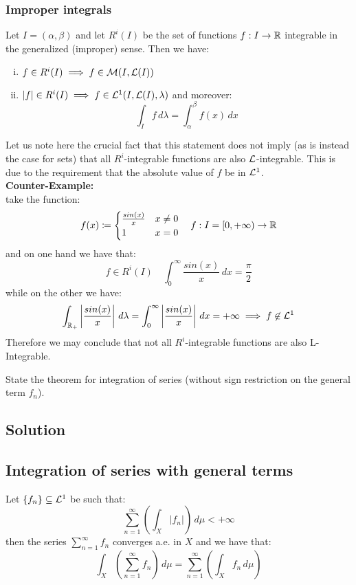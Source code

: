 \subsubsection*{Improper integrals}
Let $I=(\alpha,\beta)$ and let $R^i(I)$ be the set of functions $f:I\to\mathbb{R}$ integrable in the generalized (improper) sense. Then we have:
\begin{enumerate}[i)]
    \item $f\in R^i(I) \implies f\in\mathcal{M}(I,\mathcal{L}(I))$
    \item $|f|\in R^i(I) \implies f\in \mathcal{L}^1(I,\mathcal{L}(I),\lambda)$ and moreover:
        \[
            \int_I f \, d\lambda = \int_\alpha^\beta f(x) \, dx    
        \]
\end{enumerate}
Let us note here the crucial fact that this statement does not imply (as is instead the case for sets) that all $R^i$-integrable functions are also $\mathcal{L}$-integrable. This is due to the requirement that the absolute value of $f$ be in $\mathcal{L}^1$. \\
\textbf{Counter-Example:}\\
take the function:
\[
    f(x) \coloneqq \begin{cases}
        \frac{sin(x)}{x}  & x\neq 0\\
        1   & x=0
    \end{cases} \quad f: I=[0,+\infty)\to \mathbb{R}   
\]
and on one hand we have that:
\[
    f\in R^i(I) \quad \int_0^\infty \frac{sin(x)}{x} \, dx = \frac{\pi}{2}     
\]
while on the other we have:
\[
    \int_{\mathbb{R}_+} \left| \frac{sin(x)}{x} \right| \, d\lambda = \int_0^\infty \left| \frac{sin(x)}{x} \right| \, dx = +\infty \implies f\not\in \mathcal{L}^1
\]
Therefore we may conclude that not all $R^i$-integrable functions are also L-Integrable.


\question
State the theorem for integration of series (without sign restriction on the general term $f_n$).

\subsection*{Solution}

\subsection{Integration of series with general terms}
Let $\{ f_n \}\subseteq \mathcal{L}^1$ be such that:
\[
    \sum_{n=1}^\infty \left( \int_X | f_n | \right) \, d\mu < +\infty    
\]
then the series $\sum_{n=1}^\infty f_n$ converges a.e. in $X$ and we have that:
\[
    \int_X \left( \sum_{n=1}^\infty f_n \right) \, d\mu = \sum_{n=1}^\infty \left( \int_X f_n \, d\mu \right)   
\] 

